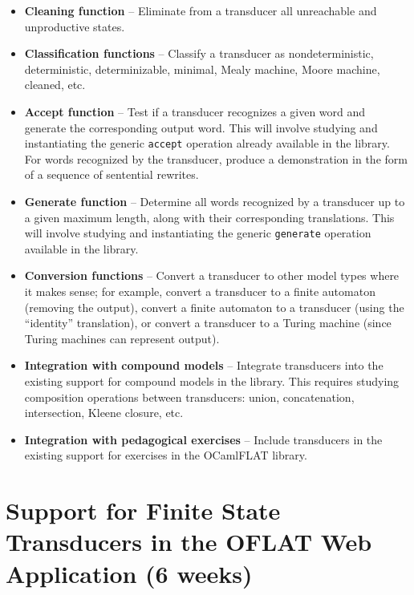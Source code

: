\begin{itemize}
    \item \textbf{Cleaning function} -- Eliminate from a transducer all unreachable and unproductive states.

    \item \textbf{Classification functions} -- Classify a transducer as nondeterministic, deterministic, determinizable, minimal, Mealy machine, Moore machine, cleaned, etc.

    \item \textbf{Accept function} -- Test if a transducer recognizes a given word and generate the corresponding output word. This will involve studying and instantiating the generic \texttt{accept} operation already available in the library. For words recognized by the transducer, produce a demonstration in the form of a sequence of sentential rewrites.

    \item \textbf{Generate function} -- Determine all words recognized by a transducer up to a given maximum length, along with their corresponding translations. This will involve studying and instantiating the generic \texttt{generate} operation available in the library.

    \item \textbf{Conversion functions} -- Convert a transducer to other model types where it makes sense; for example, convert a transducer to a finite automaton (removing the output), convert a finite automaton to a transducer (using the ``identity'' translation), or convert a transducer to a Turing machine (since Turing machines can represent output).

    \item \textbf{Integration with compound models} -- Integrate transducers into the existing support for compound models in the library. This requires studying composition operations between transducers: union, concatenation, intersection, Kleene closure, etc.

    \item \textbf{Integration with pedagogical exercises} -- Include transducers in the existing support for exercises in the OCamlFLAT library.
\end{itemize}

\section{Support for Finite State Transducers in the OFLAT Web Application (6 weeks)}

